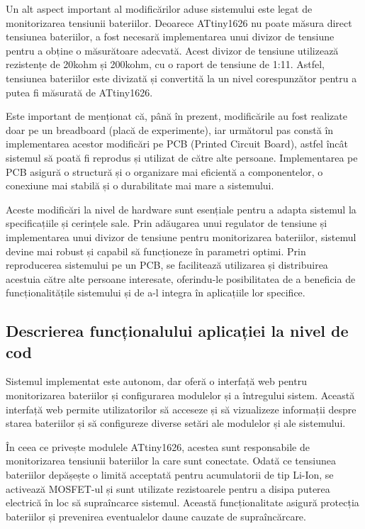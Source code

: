 Un alt aspect important al modificărilor aduse sistemului este legat de monitorizarea tensiunii bateriilor. Deoarece ATtiny1626 nu poate măsura direct tensiunea bateriilor, a fost necesară implementarea unui divizor de tensiune pentru a obține o măsurătoare adecvată. Acest divizor de tensiune utilizează rezistențe de 20kohm și 200kohm, cu o raport de tensiune de 1:11. Astfel, tensiunea bateriilor este divizată și convertită la un nivel corespunzător pentru a putea fi măsurată de ATtiny1626.

Este important de menționat că, până în prezent, modificările au fost realizate doar pe un breadboard (placă de experimente), iar următorul pas constă în implementarea acestor modificări pe PCB (Printed Circuit Board), astfel încât sistemul să poată fi reprodus și utilizat de către alte persoane. Implementarea pe PCB asigură o structură și o organizare mai eficientă a componentelor, o conexiune mai stabilă și o durabilitate mai mare a sistemului.

Aceste modificări la nivel de hardware sunt esențiale pentru a adapta sistemul la specificațiile și cerințele sale. Prin adăugarea unui regulator de tensiune și implementarea unui divizor de tensiune pentru monitorizarea bateriilor, sistemul devine mai robust și capabil să funcționeze în parametri optimi. Prin reproducerea sistemului pe un PCB, se facilitează utilizarea și distribuirea acestuia către alte persoane interesate, oferindu-le posibilitatea de a beneficia de funcționalitățile sistemului și de a-l integra în aplicațiile lor specifice.

\subsection{Descrierea funcționalului aplicației la nivel de cod}

Sistemul implementat este autonom, dar oferă o interfață web pentru monitorizarea bateriilor și configurarea modulelor și a întregului sistem. Această interfață web permite utilizatorilor să acceseze și să vizualizeze informații despre starea bateriilor și să configureze diverse setări ale modulelor și ale sistemului.

În ceea ce privește modulele ATtiny1626, acestea sunt responsabile de monitorizarea tensiunii bateriilor la care sunt conectate. Odată ce tensiunea bateriilor depășește o limită acceptată pentru acumulatorii de tip Li-Ion, se activează MOSFET-ul și sunt utilizate rezistoarele pentru a disipa puterea electrică în loc să supraîncarce sistemul. Această funcționalitate asigură protecția bateriilor și prevenirea eventualelor daune cauzate de supraîncărcare.

